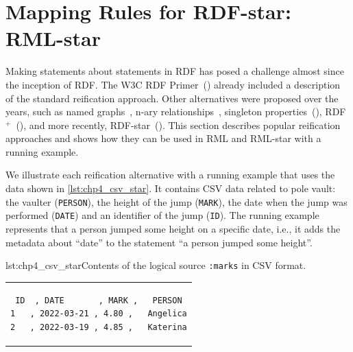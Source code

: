 \section{Mapping Rules for RDF-star: RML-star}
\label{sec:chp4_rml_star}




Making statements about statements in RDF has
posed a challenge almost since the inception of RDF.
The W3C RDF Primer~(\cite{manola2004rdf}) already included a description of the standard reification approach.
Other alternatives were proposed over the years,
such as named graphs~, n-ary relationships~, singleton properties~(\cite{nguyen2014don}), RDF$^+$~(\cite{schueler2008querying}), and more recently, \mbox{RDF-star}~(\cite{hartig2017foundations}). This section describes popular reification approaches and shows how they can be used in RML and RML-star with a running example. 

We illustrate each reification alternative with a running example that uses the data shown in \cref{lst:chp4_csv_star}.
It contains CSV data related to pole vault:
the vaulter (\texttt{PERSON}),
the height of the jump (\texttt{MARK}),
the date when the jump was performed (\texttt{DATE}) and
an identifier of the jump (\texttt{ID}).
The running example represents
that a person jumped some height on a specific date, i.e., it adds the metadata about ``date''
to the statement ``a person jumped some height''.

\noindent\hspace{0.15\linewidth}\begin{minipage}{\linewidth}
\begin{captionedlisting}{lst:chp4_csv_star}{Contents of the logical source \texttt{:marks} in CSV format.}
\centering
\begin{tabular}{c}
\hspace{3em}
{\begin{lstlisting}[basicstyle=\ttfamily\small,label={list:example1},columns=flexible]
ID  , DATE       , MARK ,   PERSON
1   , 2022-03-21 , 4.80 ,   Angelica
2   , 2022-03-19 , 4.85 ,   Katerina
\end{lstlisting}}
\end{tabular}
\end{captionedlisting}
\end{minipage}

